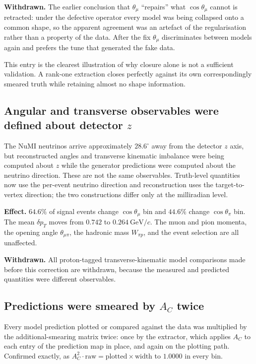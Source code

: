 \textbf{Withdrawn.} The earlier conclusion that $\theta_\mu$ ``repairs'' what
$\cos\theta_\mu$ cannot is retracted: under the defective operator every model was being
collapsed onto a common shape, so the apparent agreement was an artefact of the
regularisation rather than a property of the data.  After the fix $\theta_\mu$
discriminates between models again and prefers the tune that generated the fake data.

This entry is the clearest illustration of why closure alone is not a sufficient
validation.  A rank-one extraction closes perfectly against its own correspondingly
smeared truth while retaining almost no shape information.

\subsection{Angular and transverse observables were defined about detector \texorpdfstring{$z$}{z}}

The NuMI neutrinos arrive approximately $28.6^\circ$ away from the detector $z$ axis, but
reconstructed angles and transverse kinematic imbalance were being computed about $z$
while the generator predictions were computed about the neutrino direction.  These are
not the same observables.  Truth-level quantities now use the per-event neutrino
direction and reconstruction uses the target-to-vertex direction; the two constructions
differ only at the milliradian level.

\textbf{Effect.} $64.6\%$ of signal events change $\cos\theta_\mu$ bin and $44.6\%$ change
$\cos\theta_\pi$ bin.  The mean $\delta p_T$ moves from $0.742$ to
$0.264\ \mathrm{GeV}/c$.  The muon and pion momenta, the opening angle $\theta_{\mu\pi}$,
the hadronic mass $W_{\pi p}$, and the event selection are all unaffected.

\textbf{Withdrawn.} All proton-tagged transverse-kinematic model comparisons made before
this correction are withdrawn, because the measured and predicted quantities were
different observables.

\subsection{Predictions were smeared by \texorpdfstring{$A_C$}{A C} twice}

Every model prediction plotted or compared against the data was multiplied by the
additional-smearing matrix twice: once by the extractor, which applies $A_C$ to each entry
of the prediction map in place, and again on the plotting path.  Confirmed exactly, as
$A_C^{2}\cdot\text{raw} = \text{plotted}\times\text{width}$ to $1.0000$ in every bin.

